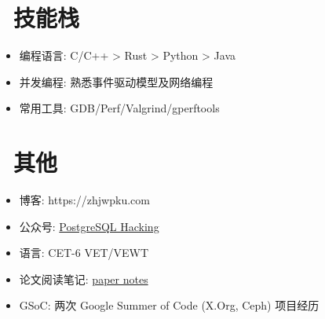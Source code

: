 \documentclass{resume}
\begin{document}
\section{\faWrench\ 技能栈}
\begin{itemize}[parsep=0.5ex]
  \item 编程语言:  C/C++ > Rust > Python > Java
  \item 并发编程: 熟悉事件驱动模型及网络编程
  \item 常用工具: GDB/Perf/Valgrind/gperftools
\end{itemize}

\section{\faCogs\ 其他}
\begin{itemize}[parsep=0.5ex]
  \item 博客: https://zhjwpku.com
  \item 公众号: \href{https://pg-x.github.io/images/wechat_qrcode.jpg}{PostgreSQL Hacking}
  \item 语言: CET-6 VET/VEWT
  \item 论文阅读笔记: \href{https://paper-notes.zhjwpku.com/}{paper notes}
  \item GSoC: 两次 Google Summer of Code (X.Org, Ceph) 项目经历
\end{itemize}
\end{document}
